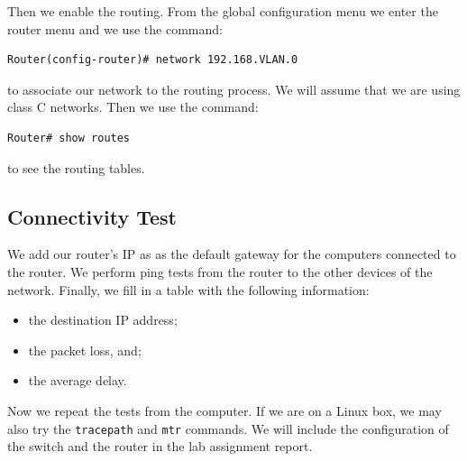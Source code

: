 Then we enable the routing. From the global configuration menu we enter the router menu and we use the command:

\begin{lstlisting}
Router(config-router)# network 192.168.VLAN.0
\end{lstlisting}

to associate our network to the routing process. We will assume that we are using class C networks. Then we use the command:

\begin{lstlisting}
Router# show routes
\end{lstlisting}

to see the routing tables.

\subsection{Connectivity Test}

We add our router's IP as as the default gateway for the computers connected to the router. We perform ping tests from the router to the other devices of the network. Finally, we fill in a table with the following information:

\begin{itemize}
\item the destination IP address;
\item the packet loss, and;
\item the average delay.
\end{itemize}

Now we repeat the tests from the computer. If we are on a Linux box, we may also try the \texttt{\color{blue}tracepath} and \texttt{\color{blue}mtr} commands. We will include the configuration of the switch and the router in the lab assignment report.

